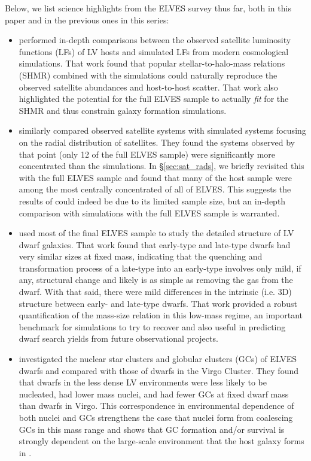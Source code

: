 \documentclass[twocolumn]{aastex62}
\begin{document}
Below, we list science highlights from the ELVES survey thus far, both in this paper and in the previous ones in this series:
\begin{itemize}
    \item \citet{carlsten2020b} performed in-depth comparisons between the observed satellite luminosity functions (LFs) of LV hosts and simulated LFs from modern cosmological simulations. That work found that popular stellar-to-halo-mass relations (SHMR) \citep[e.g.][]{gk_2017} combined with the simulations could naturally reproduce the observed satellite abundances and host-to-host scatter. That work also highlighted the potential for the full ELVES sample to actually \textit{fit} for the SHMR and thus constrain galaxy formation simulations.
    
    \item \citet{carlsten2020c} similarly compared observed satellite systems with simulated systems focusing on the radial distribution of satellites. They found the systems observed by that point (only 12 of the full ELVES sample) were significantly more concentrated than the simulations. In \S\ref{sec:sat_rads}, we briefly revisited this with the full ELVES sample and found that many of the \citet{carlsten2020c} host sample were among the most centrally concentrated of all of ELVES. This suggests the results of  \citet{carlsten2020c} could indeed be due to its limited sample size, but an in-depth comparison with simulations with the full ELVES sample is warranted.
    
    \item \citet{carlsten2021a} used most of the final ELVES sample to study the detailed structure of LV dwarf galaxies. That work found that early-type and late-type dwarfs had very similar sizes at fixed mass, indicating that the quenching and transformation process of a late-type into an early-type involves only mild, if any, structural change and likely is as simple as removing the gas from the dwarf. With that said, there were mild differences in the intrinsic (i.e. 3D) structure between early- and late-type dwarfs. That work provided a robust quantification of the mass-size relation in this low-mass regime, an important benchmark for simulations to try to recover and also useful in predicting dwarf search yields from future observational projects.
    
    \item \citet{carlsten2021b} investigated the nuclear star clusters and globular clusters (GCs) of ELVES dwarfs and compared with those of dwarfs in the Virgo Cluster. They found that dwarfs in the less dense LV environments were less likely to be nucleated, had lower mass nuclei, and had fewer GCs at fixed dwarf mass than dwarfs in Virgo. This correspondence in environmental dependence of both nuclei and GCs strengthens the case that nuclei form from coalescing GCs in this mass range \citep[e.g.][]{neumayer2020} and shows that GC formation and/or survival is strongly dependent on the large-scale environment that the host galaxy forms in \citep{peng2008}.
    

\end{itemize}
\end{document}
